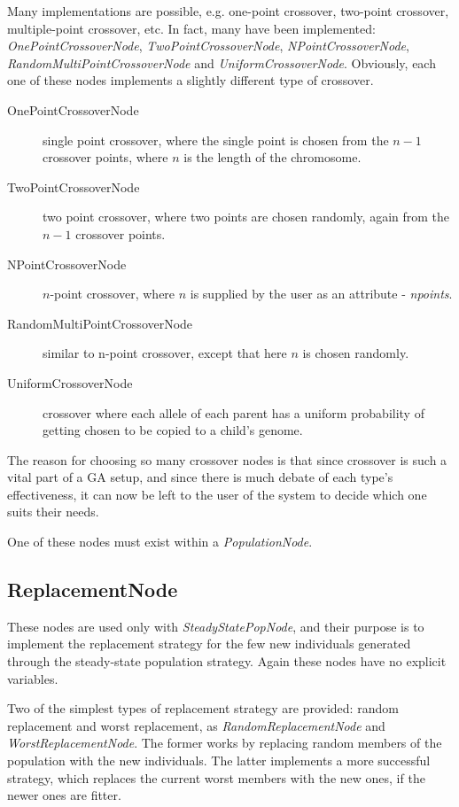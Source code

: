 \documentclass[10pt, notitlepage, a4paper]{article}
\begin{document}
Many implementations are possible, e.g. one-point crossover, two-point crossover, multiple-point crossover, etc. In fact, many have been implemented: {\it OnePointCrossoverNode}, {\it TwoPointCrossoverNode}, {\it NPointCrossoverNode}, {\it RandomMultiPointCrossoverNode} and {\it UniformCrossoverNode}. Obviously, each one of these nodes implements a slightly different type of crossover.
\begin{description}
\item[OnePointCrossoverNode] single point crossover, where the single point is chosen from the $n-1$ crossover points, where $n$ is the length of the chromosome.
\item[TwoPointCrossoverNode] two point crossover, where two points are chosen randomly, again from the $n-1$ crossover points.
\item[NPointCrossoverNode] $n$-point crossover, where $n$ is supplied by the user as an attribute - {\it npoints}.
\item[RandomMultiPointCrossoverNode] similar to n-point crossover, except that here $n$ is chosen randomly.
\item[UniformCrossoverNode] crossover where each allele of each parent has a uniform probability of getting chosen to be copied to a child's genome.
\end{description}

The reason for choosing so many crossover nodes is that since crossover is such a vital part of a GA setup, and since there is much debate of each type's effectiveness, it can now be left to the user of the system to decide which one suits their needs.

One of these nodes must exist within a {\it PopulationNode}.

\subsection{ReplacementNode}
These nodes are used only with {\it SteadyStatePopNode}, and their purpose is to implement the replacement strategy for the few new individuals generated through the steady-state population strategy. Again these nodes have no explicit variables.

Two of the simplest types of replacement strategy are provided: random replacement and worst replacement, as {\it RandomReplacementNode} and {\it WorstReplacementNode}. The former works by replacing random members of the population with the new individuals. The latter implements a more successful strategy, which replaces the current worst members with the new ones, if the newer ones are fitter.
\end{document}
